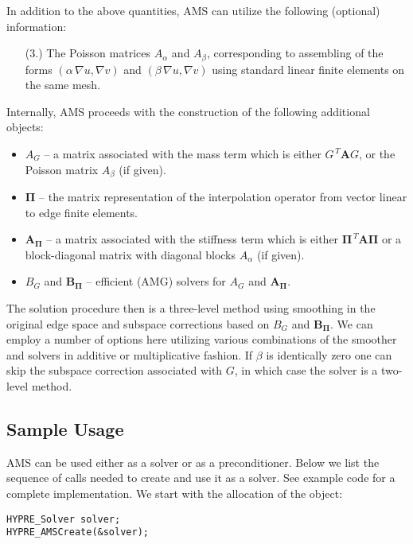 In addition to the above quantities, AMS can utilize
the following (optional) information:
\begin{enumerate}
\item[(3.)] The Poisson matrices $A_\alpha$ and $A_\beta$, corresponding to
assembling of the forms $(\alpha\, \nabla u, \nabla v)$
and $(\beta\, \nabla u, \nabla v)$ using standard linear finite elements on
the same mesh.
\end{enumerate}

\noindent
Internally, AMS proceeds with the construction of the following additional objects:
\begin{itemize}
\item $A_G$ -- a matrix associated with the mass term which is either $G^{\,T} {\mathbf A} G$, or the Poisson matrix $A_\beta$ (if given).
\item ${\mathbf \Pi}$ -- the matrix representation of the interpolation operator
from vector linear to edge finite elements.
\item ${\mathbf A}_{{\mathbf \Pi}}$ -- a matrix associated with the stiffness term which is either  ${\mathbf \Pi}^{\,T} {\mathbf A} {\mathbf \Pi}$ or a block-diagonal matrix with diagonal blocks $A_\alpha$ (if given).
\item $B_G$ and ${\mathbf B}_{{\mathbf \Pi}}$ -- efficient (AMG) solvers for $A_G$ and ${\mathbf A}_{{\mathbf \Pi}}$.
\end{itemize}
The solution procedure then is a three-level method using smoothing in
the original edge space and subspace corrections based on $B_G$ and ${\mathbf B}_{{\mathbf \Pi}}$.
We can employ a number of options here utilizing various combinations of the smoother
and solvers in additive or multiplicative fashion.
If $\beta$ is identically zero one can skip the subspace correction associated
with $G$, in which case the solver is a two-level method.

\subsection{Sample Usage}
AMS can be used either as a solver or as a preconditioner.
Below we list the sequence of \hypre{} calls
needed to create and use it as a solver.
See example code  for a complete implementation.
We start with the allocation of the  object:
\begin{display}\begin{verbatim}
HYPRE_Solver solver;
HYPRE_AMSCreate(&solver);
\end{verbatim}\end{display}

